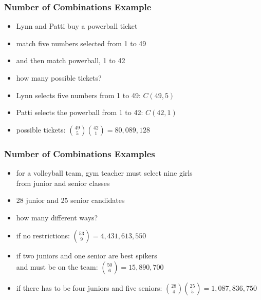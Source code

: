 \documentclass[dvipsnames]{beamer}
\begin{document}
\begin{frame}
  \frametitle{Number of Combinations Example}

  \begin{itemize}
    \item Lynn and Patti buy a powerball ticket
    \item match five numbers selected from 1 to 49
    \item and then match powerball, 1 to 42
    \item how many possible tickets?

    \pause
    \medskip
    \item Lynn selects five numbers from 1 to 49: $C(49,5)$
    \item Patti selects the powerball from 1 to 42: $C(42,1)$
    \item possible tickets:
      ${49 \choose 5}{42 \choose 1} = 80,089,128$
  \end{itemize}
\end{frame}

\begin{frame}
  \frametitle{Number of Combinations Examples}

  \begin{itemize}
    \item for a volleyball team, gym teacher must select nine girls\\
      from junior and senior classes
    \item 28 junior and 25 senior candidates
    \item how many different ways?

    \pause
    \medskip
    \item if no restrictions: ${53 \choose 9} = 4,431,613,550$
    \pause
    \item if two juniors and one senior are best spikers\\
      and must be on the team: ${50 \choose 6} = 15,890,700$
    \pause
    \item if there has to be four juniors and five seniors:
      ${28 \choose 4}{25 \choose 5} = 1,087,836,750$
  \end{itemize}
\end{frame}
\end{document}
